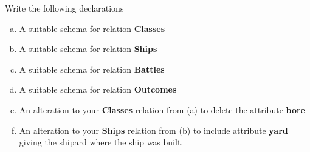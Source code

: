\documentclass[12pt]{article}
\begin{document}
\begin{enumerate}[1.]
    \bigskip

    Write the following  declarations

    \bigskip

    \begin{enumerate}[a)]
        \item A suitable schema for relation \textbf{Classes}
        \item A suitable schema for relation \textbf{Ships}
        \item A suitable schema for relation \textbf{Battles}
        \item A suitable schema for relation \textbf{Outcomes}
        \item An alteration to your \textbf{Classes} relation from (a) to delete
        the attribute \textbf{bore}
        \item An alteration to your \textbf{Ships} relation from (b) to include
        attribute \textbf{yard} giving the shipard where the ship was built.
    \end{enumerate}
\end{enumerate}
\end{document}
